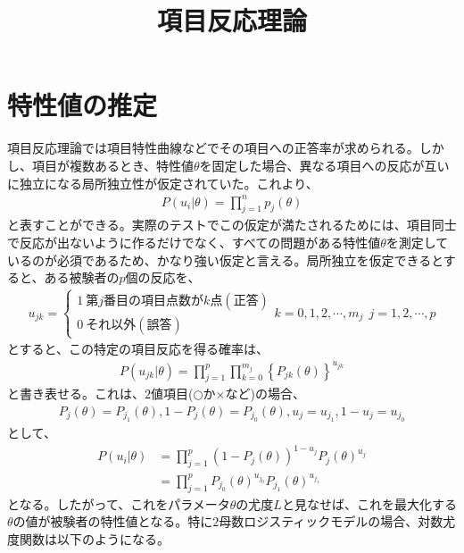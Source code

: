 \documentclass[12pt]{jarticle}
\title{項目反応理論}
\begin{document}
\maketitle
\section{特性値の推定}
項目反応理論では項目特性曲線などでその項目への正答率が求められる。しかし、項目が複数あるとき、特性値$\theta$を固定した場合、異なる項目への反応が互いに独立になる局所独立性が仮定されていた。これより、
\begin{eqnarray}
  \label{00}
  \displaystyle P(u_{i}|\theta) =\prod_{j = 1}^{n} p_{j}(\theta)
\end{eqnarray}
と表すことができる。実際のテストでこの仮定が満たされるためには、項目同士で反応が出ないように作るだけでなく、すべての問題がある特性値$\theta$を測定しているのが必須であるため、かなり強い仮定と言える。局所独立を仮定できるとすると、ある被験者の$p$個の反応を、
\begin{eqnarray}
  \label{01}
  \displaystyle u_{jk} =\left\{\begin{array}{l}1 \ 第j番目の項目点数がk点(正答)\\ 0 \ それ以外(誤答)\end{array}\right. k = 0,1,2,\cdots,m_{j} \ \ j = 1,2,\cdots,p
\end{eqnarray}
とすると、この特定の項目反応を得る確率は、
\begin{eqnarray}
  \label{02}
  \displaystyle P(u_{jk}|\theta) = \prod_{j = 1}^{p} \prod_{k = 0}^{m_j} \left\{P_{jk}(\theta)\right\}^{u_{jk}}
\end{eqnarray}
と書き表せる。これは、$2$値項目($\bigcirc$か$\times$など)の場合、
\begin{eqnarray}
  \label{03}
  \displaystyle P_{j}(\theta) = P_{j_1}(\theta),1 - P_j(\theta) = P_{j_0}(\theta),u_j = u_{j_1},1 - u_j = u_{j_0}
\end{eqnarray}
として、
\begin{align}
  \label{04}
  \displaystyle P(u_{i}|\theta) &= \prod_{j = 1}^{p} (1 - P_j(\theta))^{1 - u_j}P_j(\theta)^{u_j}\\
  &=\prod_{j = 1}^{p} P_{j_0}(\theta)^{u_{j_0}}P_{j_1}(\theta)^{u_{j_1}}
\end{align}
となる。したがって、これをパラメータ$\theta$の尤度$L$と見なせば、これを最大化する$\theta$の値が被験者の特性値となる。特に$2$母数ロジスティックモデルの場合、対数尤度関数は以下のようになる。
\end{document}
